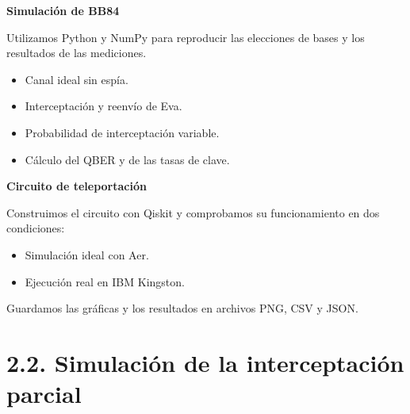 \documentclass{afitdefense}
\begin{document}
\begin{Center}

\begin{minipage}[t]{0.47\textwidth}
\small

\textbf{Simulación de BB84}

\medskip

Utilizamos Python y NumPy para reproducir
las elecciones de bases y los resultados
de las mediciones.

\begin{itemize}
    \item Canal ideal sin espía.
    \item Interceptación y reenvío de Eva.
    \item Probabilidad de interceptación variable.
    \item Cálculo del QBER y de las tasas de clave.
\end{itemize}

\end{minipage}
\hfill
\begin{minipage}[t]{0.47\textwidth}
\small

\textbf{Circuito de teleportación}

\medskip

Construimos el circuito con Qiskit
y comprobamos su funcionamiento
en dos condiciones:

\begin{itemize}
    \item Simulación ideal con Aer.
    \item Ejecución real en IBM Kingston.
\end{itemize}

\medskip

Guardamos las gráficas y los resultados
en archivos PNG, CSV y JSON.

\end{minipage}

\end{Center}


\section{2.2. Simulación de la interceptación parcial}
\end{document}

